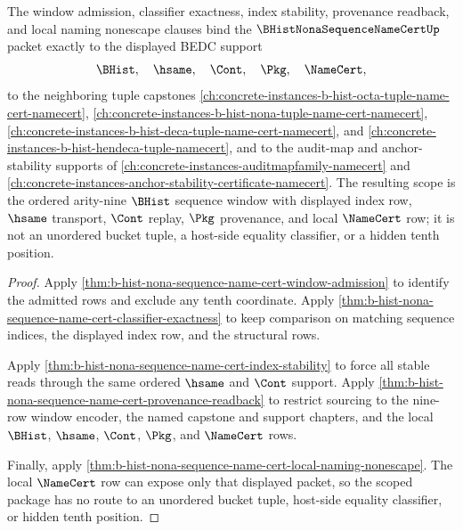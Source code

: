 \begin{theorem}
\label{thm:b-hist-nona-sequence-name-cert-scoped-support-package}
The window admission, classifier exactness, index stability, provenance readback, and local naming nonescape clauses bind the $\BHistNonaSequenceNameCertUp$ packet exactly to the displayed BEDC support
$$
\BHist,\quad \hsame,\quad \Cont,\quad \Pkg,\quad \NameCert,
$$
to the neighboring tuple capstones
\autoref{ch:concrete-instances-b-hist-octa-tuple-name-cert-namecert},
\autoref{ch:concrete-instances-b-hist-nona-tuple-name-cert-namecert},
\autoref{ch:concrete-instances-b-hist-deca-tuple-name-cert-namecert},
and \autoref{ch:concrete-instances-b-hist-hendeca-tuple-namecert}, and to the audit-map and anchor-stability supports of \autoref{ch:concrete-instances-auditmapfamily-namecert} and \autoref{ch:concrete-instances-anchor-stability-certificate-namecert}. The resulting scope is the ordered arity-nine $\BHist$ sequence window with displayed index row, $\hsame$ transport, $\Cont$ replay, $\Pkg$ provenance, and local $\NameCert$ row; it is not an unordered bucket tuple, a host-side equality classifier, or a hidden tenth position.
\end{theorem}
\begin{proof}
Apply \autoref{thm:b-hist-nona-sequence-name-cert-window-admission} to identify the admitted rows and exclude any tenth coordinate. Apply \autoref{thm:b-hist-nona-sequence-name-cert-classifier-exactness} to keep comparison on matching sequence indices, the displayed index row, and the structural rows.

Apply \autoref{thm:b-hist-nona-sequence-name-cert-index-stability} to force all stable reads through the same ordered $\hsame$ and $\Cont$ support. Apply \autoref{thm:b-hist-nona-sequence-name-cert-provenance-readback} to restrict sourcing to the nine-row window encoder, the named capstone and support chapters, and the local $\BHist$, $\hsame$, $\Cont$, $\Pkg$, and $\NameCert$ rows.

Finally, apply \autoref{thm:b-hist-nona-sequence-name-cert-local-naming-nonescape}. The local $\NameCert$ row can expose only that displayed packet, so the scoped package has no route to an unordered bucket tuple, host-side equality classifier, or hidden tenth position.
\end{proof}


